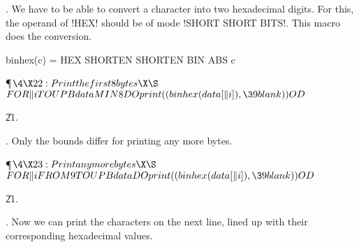 . We have to be able to convert a character into two hexadecimal
digits. For this, the operand of !HEX! should be of mode !SHORT SHORT
BITS!. This macro does the conversion.

binhex(c) = HEX SHORTEN SHORTEN BIN ABS c

\Y\P$\4\X22:Print the first 8 bytes\X\S$\6
$\\{FOR}\|i\\{TO}\\{UPB}\\{data}\\{MIN}8\\{DO}\\{print}((\\{binhex}(\\{data}[%
\|i]),\39\\{blank}))\\{OD}$\par
\U21.\fi

. Only the bounds differ for printing any more bytes.

\Y\P$\4\X23:Print any more bytes\X\S$\6
$\\{FOR}\|i\\{FROM}9\\{TO}\\{UPB}\\{data}\\{DO}\\{print}((\\{binhex}(\\{data}[%
\|i]),\39\\{blank}))\\{OD}$\par
\U21.\fi

. Now we can print the characters on the next line, lined up with
their corresponding hexadecimal values.


